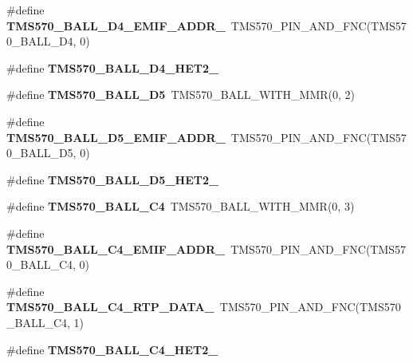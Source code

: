 \begin{DoxyCompactItemize}
\item 
\mbox{\label{tms570lc4357-pins_8h_ab4e346e97a680f70d25752326b9c9458}} 
\#define {\bfseries T\+M\+S570\+\_\+\+B\+A\+L\+L\+\_\+\+D4\+\_\+\+E\+M\+I\+F\+\_\+\+A\+D\+D\+R\+\_}~T\+M\+S570\+\_\+\+P\+I\+N\+\_\+\+A\+N\+D\+\_\+\+F\+NC(T\+M\+S570\+\_\+\+B\+A\+L\+L\+\_\+\+D4, 0)
\item 
\#define {\bfseries T\+M\+S570\+\_\+\+B\+A\+L\+L\+\_\+\+D4\+\_\+\+H\+E\+T2\+\_}
\item 
\mbox{\label{tms570lc4357-pins_8h_ac384a45677d0a92e215c2062104dd847}} 
\#define {\bfseries T\+M\+S570\+\_\+\+B\+A\+L\+L\+\_\+\+D5}~T\+M\+S570\+\_\+\+B\+A\+L\+L\+\_\+\+W\+I\+T\+H\+\_\+\+M\+MR(0, 2)
\item 
\mbox{\label{tms570lc4357-pins_8h_af2882a40d6e584e8be9e1e8cd0dd097d}} 
\#define {\bfseries T\+M\+S570\+\_\+\+B\+A\+L\+L\+\_\+\+D5\+\_\+\+E\+M\+I\+F\+\_\+\+A\+D\+D\+R\+\_}~T\+M\+S570\+\_\+\+P\+I\+N\+\_\+\+A\+N\+D\+\_\+\+F\+NC(T\+M\+S570\+\_\+\+B\+A\+L\+L\+\_\+\+D5, 0)
\item 
\#define {\bfseries T\+M\+S570\+\_\+\+B\+A\+L\+L\+\_\+\+D5\+\_\+\+H\+E\+T2\+\_}
\item 
\mbox{\label{tms570lc4357-pins_8h_ac2a75caff7eb1c6c1c94f951db52cc2e}} 
\#define {\bfseries T\+M\+S570\+\_\+\+B\+A\+L\+L\+\_\+\+C4}~T\+M\+S570\+\_\+\+B\+A\+L\+L\+\_\+\+W\+I\+T\+H\+\_\+\+M\+MR(0, 3)
\item 
\mbox{\label{tms570lc4357-pins_8h_a21708119899b55fdd6273cd83149f77c}} 
\#define {\bfseries T\+M\+S570\+\_\+\+B\+A\+L\+L\+\_\+\+C4\+\_\+\+E\+M\+I\+F\+\_\+\+A\+D\+D\+R\+\_}~T\+M\+S570\+\_\+\+P\+I\+N\+\_\+\+A\+N\+D\+\_\+\+F\+NC(T\+M\+S570\+\_\+\+B\+A\+L\+L\+\_\+\+C4, 0)
\item 
\mbox{\label{tms570lc4357-pins_8h_a99145a15ff0fb77dddf1f8c991f043f7}} 
\#define {\bfseries T\+M\+S570\+\_\+\+B\+A\+L\+L\+\_\+\+C4\+\_\+\+R\+T\+P\+\_\+\+D\+A\+T\+A\+\_}~T\+M\+S570\+\_\+\+P\+I\+N\+\_\+\+A\+N\+D\+\_\+\+F\+NC(T\+M\+S570\+\_\+\+B\+A\+L\+L\+\_\+\+C4, 1)
\item 
\#define {\bfseries T\+M\+S570\+\_\+\+B\+A\+L\+L\+\_\+\+C4\+\_\+\+H\+E\+T2\+\_}
\item 

\end{DoxyCompactItemize}
